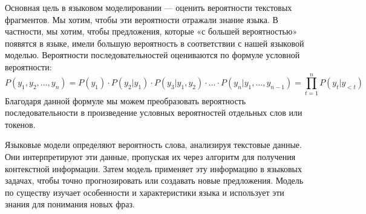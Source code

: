 Основная цель в языковом моделировании --- оценить вероятности текстовых фрагментов. Мы хотим, чтобы эти вероятности отражали знание языка. В частности, мы хотим, чтобы предложения, которые «с большей вероятностью» появятся в языке, имели большую вероятность в соответствии с нашей языковой моделью. Вероятности последовательностей оцениваются по формуле условной вероятности:
\begin{equation}
	P(y_1, y_2,...,y_n) = P(y_1) \cdot P(y_2|y_1) \cdot P(y_3|y_1, y_2) \cdot ... \cdot P(y_n|y_1,...,y_{n-1}) = \prod_{t=1}^n{P(y_t|y_{<t})}
\end{equation}
Благодаря данной формуле мы можем преобразовать вероятность последовательности в произведение условных вероятностей отдельных слов или токенов.~\cite{lena-voita-lm}

Языковые модели определяют вероятность слова, анализируя текстовые данные. Они интерпретируют эти данные, пропуская их через алгоритм для получения контекстной информации. Затем модель применяет эту информацию в языковых задачах, чтобы точно прогнозировать или создавать новые предложения. Модель по существу изучает особенности и характеристики языка и использует эти знания для понимания новых фраз.


